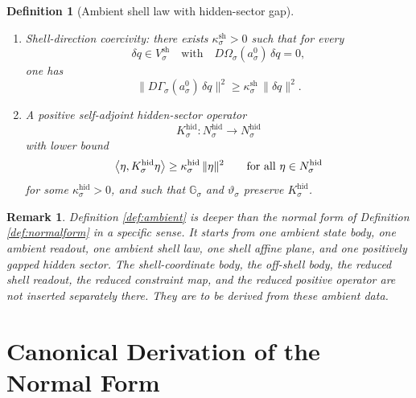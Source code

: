 \documentclass[11pt]{article}
\newcommand{\AmbientRead}[1]{\Omega_{#1}}
\newcommand{\AmbientShellLaw}[1]{\Gamma_{#1}}
\newcommand{\AmbientSym}[1]{\mathbb G_{#1}}
\newcommand{\AmbientTime}[1]{\vartheta_{#1}}
\newcommand{\ShellVector}[1]{V_{#1}^{\mathrm{sh}}}
\newcommand{\HiddenSpace}[1]{N_{#1}^{\mathrm{hid}}}
\newcommand{\HiddenOperator}[1]{K_{#1}^{\mathrm{hid}}}
\newcommand{\AmbientRef}[1]{a_{#1}^{0}}
\newtheorem{definition}{Definition}
\newtheorem{remark}{Remark}
\begin{document}
\begin{definition}[Ambient shell law with hidden-sector gap]
\begin{enumerate}
    \item Shell-direction coercivity: there exists \(\kappa_{\sigma}^{\mathrm{sh}}>0\) such that for every
    \[
    \delta q\in \ShellVector{\sigma}
    \quad\text{with}\quad
    D\AmbientRead{\sigma}(\AmbientRef{\sigma})\,\delta q=0,
    \]
    one has
    \begin{equation}
    \bigl\|
    D\AmbientShellLaw{\sigma}(\AmbientRef{\sigma})\,\delta q
    \bigr\|^{2}
    \ge
    \kappa_{\sigma}^{\mathrm{sh}}\,
    \|\delta q\|^{2}.
    \label{eq:shellcoercive}
    \end{equation}
    \item A positive self-adjoint hidden-sector operator
    \[
    \HiddenOperator{\sigma}:\HiddenSpace{\sigma}\to\HiddenSpace{\sigma}
    \]
    with lower bound
    \begin{equation}
    \ev{\eta,\HiddenOperator{\sigma}\eta}
    \ge
    \kappa_{\sigma}^{\mathrm{hid}}\,
    \|\eta\|^{2}
    \qquad
    \text{for all }\eta\in\HiddenSpace{\sigma}
    \label{eq:hiddengap}
    \end{equation}
    for some \(\kappa_{\sigma}^{\mathrm{hid}}>0\), and such that \(\AmbientSym{\sigma}\) and \(\AmbientTime{\sigma}\) preserve \(\HiddenOperator{\sigma}\).
\end{enumerate}
\end{definition}

\begin{remark}
Definition \ref{def:ambient} is deeper than the normal form of Definition \ref{def:normalform} in a specific sense. It starts from one ambient state body, one ambient readout, one ambient shell law, one shell affine plane, and one positively gapped hidden sector. The shell-coordinate body, the off-shell body, the reduced shell readout, the reduced constraint map, and the reduced positive operator are not inserted separately there. They are to be derived from these ambient data.
\end{remark}

\section{Canonical Derivation of the Normal Form}
\end{document}
